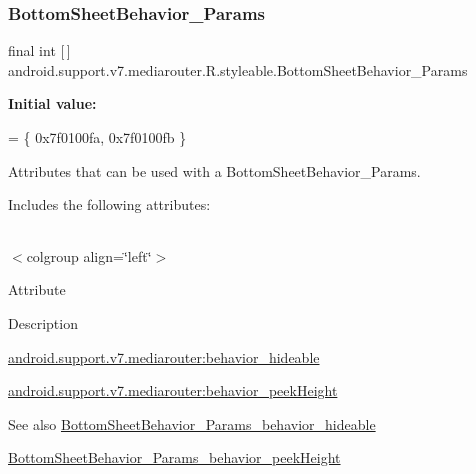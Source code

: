 \subsubsection{\texorpdfstring{Bottom\+Sheet\+Behavior\+\_\+\+Params}{BottomSheetBehavior\_Params}}
{\footnotesize\ttfamily final int \mbox{[}$\,$\mbox{]} android.\+support.\+v7.\+mediarouter.\+R.\+styleable.\+Bottom\+Sheet\+Behavior\+\_\+\+Params\hspace{0.3cm}{\ttfamily [static]}}

{\bfseries Initial value\+:}
\begin{DoxyCode}
= \{
            0x7f0100fa, 0x7f0100fb
        \}
\end{DoxyCode}
Attributes that can be used with a Bottom\+Sheet\+Behavior\+\_\+\+Params. 

Includes the following attributes\+:

\tabulinesep=1mm
\begin{longtabu} spread 0pt [c]{*{0}{|X[-1]}|}
\hline
\end{longtabu}
$<$colgroup align=\char`\"{}left\char`\"{}$>$ 

Attribute

Description 

{\ttfamily \hyperlink{classandroid_1_1support_1_1v7_1_1mediarouter_1_1R_1_1styleable_ac16c268a6545ed510df667b1e0997bf7}{android.\+support.\+v7.\+mediarouter\+:behavior\+\_\+hideable}}

{\ttfamily \hyperlink{classandroid_1_1support_1_1v7_1_1mediarouter_1_1R_1_1styleable_a8c29b649bf80308e39a67a58955949e7}{android.\+support.\+v7.\+mediarouter\+:behavior\+\_\+peek\+Height}}

\begin{DoxySeeAlso}{See also}
\hyperlink{classandroid_1_1support_1_1v7_1_1mediarouter_1_1R_1_1styleable_ac16c268a6545ed510df667b1e0997bf7}{Bottom\+Sheet\+Behavior\+\_\+\+Params\+\_\+behavior\+\_\+hideable} 

\hyperlink{classandroid_1_1support_1_1v7_1_1mediarouter_1_1R_1_1styleable_a8c29b649bf80308e39a67a58955949e7}{Bottom\+Sheet\+Behavior\+\_\+\+Params\+\_\+behavior\+\_\+peek\+Height} 
\end{DoxySeeAlso}
\mbox{\label{classandroid_1_1support_1_1v7_1_1mediarouter_1_1R_1_1styleable_ac16c268a6545ed510df667b1e0997bf7}} 
